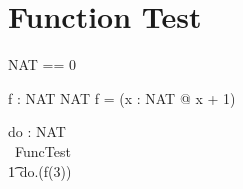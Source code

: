 \chapter{Function Test}

\begin{zed}
  NAT == 0 
\end{zed}

\begin{axdef}
 f : NAT \fun NAT
\where
 f = (\lambda x : NAT @ x + 1)
\end{axdef}

\begin{circus}
\circchannel do : NAT \\
\circprocess\ FuncTest \circdef \circbegin \\
\t1 \circspot do.(f(3)) \then \Skip \\
\circend
\end{circus}
